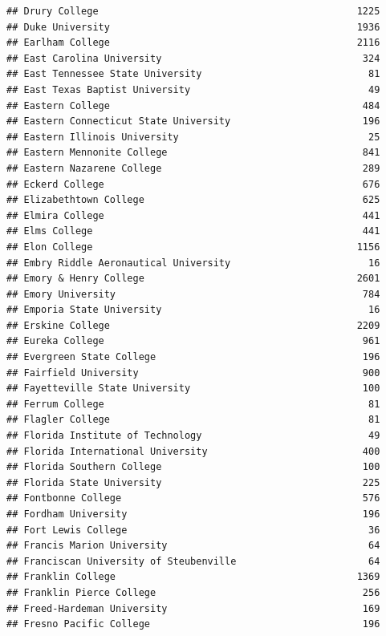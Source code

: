 \documentclass[
]{article}
\begin{document}
\begin{verbatim}
## Drury College                                             1225
## Duke University                                           1936
## Earlham College                                           2116
## East Carolina University                                   324
## East Tennessee State University                             81
## East Texas Baptist University                               49
## Eastern College                                            484
## Eastern Connecticut State University                       196
## Eastern Illinois University                                 25
## Eastern Mennonite College                                  841
## Eastern Nazarene College                                   289
## Eckerd College                                             676
## Elizabethtown College                                      625
## Elmira College                                             441
## Elms College                                               441
## Elon College                                              1156
## Embry Riddle Aeronautical University                        16
## Emory & Henry College                                     2601
## Emory University                                           784
## Emporia State University                                    16
## Erskine College                                           2209
## Eureka College                                             961
## Evergreen State College                                    196
## Fairfield University                                       900
## Fayetteville State University                              100
## Ferrum College                                              81
## Flagler College                                             81
## Florida Institute of Technology                             49
## Florida International University                           400
## Florida Southern College                                   100
## Florida State University                                   225
## Fontbonne College                                          576
## Fordham University                                         196
## Fort Lewis College                                          36
## Francis Marion University                                   64
## Franciscan University of Steubenville                       64
## Franklin College                                          1369
## Franklin Pierce College                                    256
## Freed-Hardeman University                                  169
## Fresno Pacific College                                     196

\end{verbatim}
\end{document}
